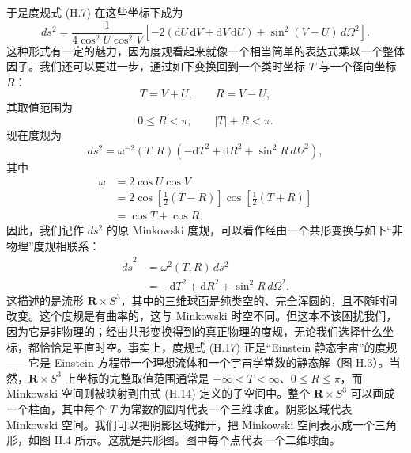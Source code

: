 于是度规式 (H.7) 在这些坐标下成为
\begin{equation*}
ds^{2} = \frac{1}{4\cos^{2}U\cos^{2}V}\left[-2(\mathrm{d}U\,\mathrm{d}V + \mathrm{d}V\,\mathrm{d}U) + \sin^{2}(V-U)\,d\Omega^{2}\right].
\tag{H.12}
\end{equation*}
这种形式有一定的魅力，因为度规看起来就像一个相当简单的表达式乘以一个整体因子。我们还可以更进一步，通过如下变换回到一个类时坐标 $T$ 与一个径向坐标 $R$：
\begin{equation*}
T = V + U, \qquad R = V - U,
\tag{H.13}
\end{equation*}
其取值范围为
\begin{equation*}
0 \le R < \pi, \qquad |T| + R < \pi.
\tag{H.14}
\end{equation*}
现在度规为
\begin{equation*}
ds^{2} = \omega^{-2}(T,R)\left(-\mathrm{d}T^{2} + \mathrm{d}R^{2} + \sin^{2}R\,d\Omega^{2}\right),
\tag{H.15}
\end{equation*}
其中
\begin{align*}
\omega &= 2\cos U\cos V \\
&= 2\cos\left[\frac{1}{2}(T-R)\right]\cos\left[\frac{1}{2}(T+R)\right] \\
&= \cos T + \cos R.
\tag{H.16}
\end{align*}
因此，我们记作 $ds^{2}$ 的原 Minkowski 度规，可以看作经由一个共形变换与如下“非物理”度规相联系：
\begin{equation*}
\begin{aligned}
\widetilde{ds}^{2} &= \omega^{2}(T,R)\,ds^{2} \\
&= -\mathrm{d}T^{2} + \mathrm{d}R^{2} + \sin^{2}R\,d\Omega^{2}.
\end{aligned}
\tag{H.17}
\end{equation*}
这描述的是流形 $\mathbf{R} \times S^{3}$，其中的三维球面是纯类空的、完全浑圆的，且不随时间改变。这个度规是有曲率的，这与 Minkowski 时空不同。但这本不该困扰我们，因为它是非物理的；经由共形变换得到的真正物理的度规，无论我们选择什么坐标，都恰恰是平直时空。事实上，度规式 (H.17) 正是“Einstein 静态宇宙”的度规——它是 Einstein 方程带一个理想流体和一个宇宙学常数的静态解（图 H.3）。当然，$\mathbf{R} \times S^{3}$ 上坐标的完整取值范围通常是 $-\infty < T < \infty$、$0 \le R \le \pi$，而 Minkowski 空间则被映射到由式 (H.14) 定义的子空间中。整个 $\mathbf{R} \times S^{3}$ 可以画成一个柱面，其中每个 $T$ 为常数的圆周代表一个三维球面。阴影区域代表 Minkowski 空间。我们可以把阴影区域摊开，把 Minkowski 空间表示成一个三角形，如图 H.4 所示。这就是共形图。图中每个点代表一个二维球面。

